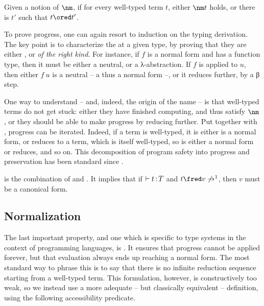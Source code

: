 \begin{property}
  Given a notion of  $\nm$, if for every well-typed term $t$,
  either $\nm t$ holds, or there is $t'$ such that $t \ored t'$.
\end{property}

To prove progress, one can again resort to induction on the typing derivation. The key point
is to characterize the  at a given type,
by proving that they are either , or 
\emph{of the right kind}.
For instance, if $f$ is a normal form and has a function type, then it must be
either a neutral, or a λ-abstraction. If $f$ is applied to $u$, then either $f\ u$ is
a neutral – a thus a normal form –, or it reduces further, by a β step.

One way to understand  – and, indeed, the origin of the name – is that well-typed
terms do not get stuck: either they have finished computing, and thus satisfy $\nm$, or
they should be able to make progress by reducing further.
Put together with , progress can be iterated. Indeed,
if a term is well-typed, it is either is a normal form, or reduces to a term, which is itself
well-typed, so is either a normal form or reduces, and so on. This decomposition of
program safety into progress and preservation
has been standard since .

\begin{property}
   is the combination of  and .
  It implies that if $\vdash t \operatorname{\mathrel{:}} T$ and $t \red v \nored$, then $v$ must be a
  canonical form.
\end{property}



\subsection{Normalization}

The last important property, and one which is specific to type systems in the context of
programming languages, is . It ensures that progress cannot be applied
forever, but that evaluation always ends up reaching a normal form.
The most standard way to phrase this is to say that there is no infinite reduction sequence 
starting from a well-typed term. This formulation, however, is constructively too weak,
so we instead use a more adequate – but classically equivalent – definition,
using the following accessibility predicate.

